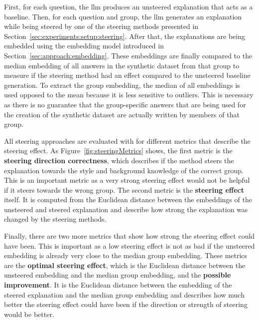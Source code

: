 First, for each question, the \ac{llm} produces an unsteered explanation that acts as a baseline.
Then, for each  question and group, the \ac{llm} generates an explanation while being steered by one of the steering methods presented in Section~\ref{sec:experiments:setup:steering}. After that, the explanations are being embedded using the embedding model introduced in Section~\ref{sec:approach:embedding}. These embeddings are finally compared to the median embedding of all answers in the synthetic dataset from that group to measure if the steering method had an effect compared to the unsteered baseline generation.
To extract the group embedding, the median of all embeddings is used opposed to the mean because it is less sensitive to outliers. This is necessary as there is no guarantee that the group-specific answers that are being used for the creation of the synthetic dataset are actually written by members of that group.

All steering approaches are evaluated with for different metrics that describe the steering effect. As Figure~\ref{fig:steeringMetrics} shows, the first metric is the \textbf{steering direction correctness}, which describes if the method steers the explanation towards the style and background knowledge of the correct group. This is an important metric as a very strong steering effect would not be helpful if it steers towards the wrong group. The second metric is the \textbf{steering effect} itself. It is computed from the Euclidean distance between the embeddings of the unsteered and steered explanation and describe how strong the explanation was changed by the steering methods.

Finally, there are two more metrics that show how strong the steering effect could have been. This is important as a low steering effect is not as bad if the unsteered embedding is already very close to the median group embedding. These metrics are the \textbf{optimal steering effect}, which is the Euclidean distance between the unsteered embedding and the median group embedding, and the \textbf{possible improvement}. It is the Euclidean distance between the embedding of the steered explanation and the median group embedding and describes how much better the steering effect could have been if the direction or strength of steering would be better.


